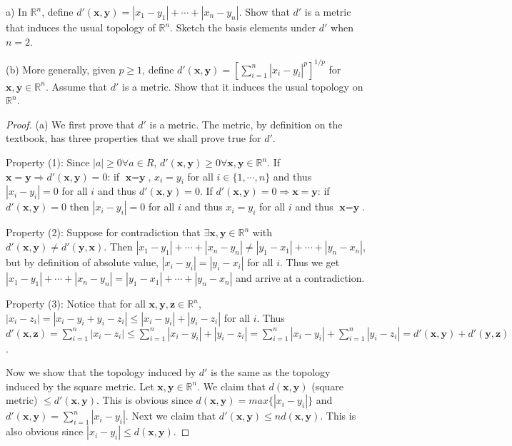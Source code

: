 \documentclass[12pt]{article}
\newenvironment{problem}[2][Problem]
{
	\begin{trivlist} 
		\item[\hskip \labelsep {\bfseries #1 #2:}]
	}
{
	\end{trivlist}
	}
\begin{document}
\newpage
\begin{problem}{20.1}
(a) In $\mathbb{R}^n$, define $d'(\textbf{x}, \textbf{y}) = |x_1-y_1|+\cdots+|x_n-y_n|$. Show that $d'$ is a metric that induces the usual topology of $\mathbb{R}^n$. Sketch the basis elements under $d'$ when $n = 2$.

(b) More generally, given $p\geq 1$, define $d'(\textbf{x}, \textbf{y}) = [\sum^{n}_{i = 1}|x_i - y_i|^p]^{1/p}$ for $\textbf{x}, \textbf{y} \in \mathbb{R}^n$. Assume that $d'$ is a metric. Show that it induces the usual topology on $\mathbb{R}^n$.
\end{problem}
\begin{proof}
(a) We first prove that $d'$ is a metric. The metric, by definition on the textbook, has three properties that we shall prove true for $d'$. 

Property (1): Since $|a| \geq 0 \forall a\in R$, $d'(\textbf{x}, \textbf{y}) \geq 0 \forall \textbf{x}, \textbf{y} \in \mathbb{R}^n$. If $\textbf{x} = \textbf{y} \Rightarrow d'(\textbf{x}, \textbf{y}) = 0$: if $\textbf{x} = \textbf{y}$, $x_i = y_i$ for all $i \in \{1, \cdots, n\}$ and thus $|x_i - y_i| = 0$ for all $i$ and thus $d'(\textbf{x}, \textbf{y}) = 0$. If $d'(\textbf{x}, \textbf{y}) = 0 \Rightarrow \textbf{x} = \textbf{y}$: if $d'(\textbf{x}, \textbf{y}) = 0$ then $|x_i - y_i| = 0$ for all $i$ and thus $x_i = y_i$ for all $i$ and thus $\textbf{x} = \textbf{y}$. 

Property (2): Suppose for contradiction that $\exists \textbf{x}, \textbf{y} \in \mathbb{R}^n$ with $d'(\textbf{x}, \textbf{y}) \neq d'(\textbf{y}, \textbf{x})$. Then $|x_1 - y_1| + \cdots + |x_n - y_n| \neq |y_1 - x_1| + \cdots + |y_n - x_n|$, but by definition of absolute value, $|x_i - y_i| = |y_i - x_i|$ for all $i$. Thus we get $|x_1 - y_1| + \cdots + |x_n - y_n| = |y_1 - x_1| + \cdots + |y_n - x_n|$ and arrive at a contradiction. 

Property (3): Notice that for all $\textbf{x}, \textbf{y}, \textbf{z} \in \mathbb{R}^n$, $|x_i - z_i| = |x_i - y_i + y_i - z_i| \leq |x_i - y_i| + |y_i - z_i|$ for all $i$. Thus $d'(\textbf{x}, \textbf{z}) = \sum_{i = 1}^{n}|x_i - z_i| \leq \sum_{i = 1}^{n} |x_i - y_i| + |y_i - z_i| = \sum_{i = 1}^{n}|x_i - y_i| + \sum_{i = 1}^{n}|y_i - z_i| = d'(\textbf{x}, \textbf{y}) + d'(\textbf{y}, \textbf{z})$. 

Now we show that the topology induced by $d'$ is the same as the topology induced by the square metric. Let $\textbf{x}, \textbf{y} \in \mathbb{R}^n$. We claim that $d(\textbf{x}, \textbf{y})$ (square metric) $\leq d'(\textbf{x}, \textbf{y})$. This is obvious since $d(\textbf{x}, \textbf{y}) = max\{|x_i - y_i|\}$ and $d'(\textbf{x}, \textbf{y}) = \sum_{i = 1}^n |x_i-y_i|$. Next we claim that $d'(\textbf{x}, \textbf{y}) \leq nd(\textbf{x}, \textbf{y})$. This is also obvious since $|x_i - y_i| \leq d(\textbf{x}, \textbf{y})$. 


\end{proof}
\end{document}
